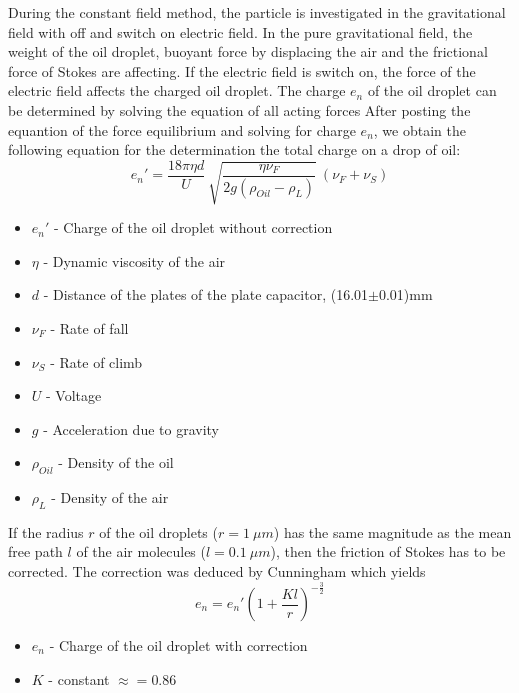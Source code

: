 \documentclass{tudphygp_eng}
\begin{document}
During the constant field method, the particle is investigated in the gravitational field with off and switch on electric field. In the pure gravitational field, the weight of the oil droplet, buoyant force by displacing the air and the frictional force of Stokes are affecting. If the electric field is switch on, the force of the electric field affects the charged oil droplet. The charge $e_n$ of the oil droplet can be determined by solving the equation of all acting forces
After posting the equantion of the force equilibrium and solving for charge $e_n$, we obtain the following equation for the determination the total charge on a drop of oil:
\begin{equation}
\label{eqoil}
{e_n}'= \frac{18{\pi}{\eta}{d}}{U}~\sqrt{\frac{{\eta}{\nu_F}}{2g({\rho_{Oil}}-{\rho_L})}}~({\nu_F}+{\nu_S})
\end{equation}

\begin{itemize}

\item ${e_n}'$ - Charge of the oil droplet without correction
\item $\eta$ - Dynamic viscosity of the air
\item $d$ - Distance of the plates of the plate capacitor, (16.01$\pm$0.01)mm
\item $\nu_F$ - Rate of fall
\item $\nu_S$ - Rate of climb
\item $U$ - Voltage
\item $g$ - Acceleration due to gravity
\item $\rho_{Oil}$ - Density of the oil
\item $\rho_L$ - Density of the air

\end{itemize}

If the radius $r$ of the oil droplets ($r=1~{\mu}m$) has the same magnitude as the mean free path $l$ of the air molecules ($l=0.1~{\mu}m$), then the friction of Stokes has to be corrected. The correction was deduced by Cunningham which yields
\begin{equation}
\label{eqcunning}
{e_n}={e_n}'(1+\frac{Kl}{r})^{-\frac{3}{2}}
\end{equation} 

\begin{itemize}

\item ${e_n}$ - Charge of the oil droplet with correction
\item $K$ - constant $\approx=0.86$

\end{itemize}
\end{document}
